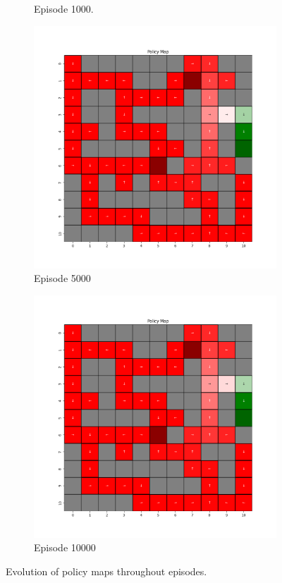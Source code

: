 \documentclass{assignment}
\begin{document}
\begin{figure}[H]
\begin{subfigure}{0.3\textwidth}
    \caption{Episode 1000.}
    \end{subfigure}\hfill
    \begin{subfigure}{0.3\textwidth}
        \includegraphics[width=\textwidth]{figures/policy_q/gamma_sweep/policy_alpha_0.1_gamma_0.75_epsilon_0.2_iteration_5000.png}
    \caption{Episode 5000}
    \end{subfigure}\hfill
    \begin{subfigure}{0.3\textwidth}
        \includegraphics[width=\textwidth]{figures/policy_q/gamma_sweep/policy_alpha_0.1_gamma_0.75_epsilon_0.2_iteration_10000.png}
    \caption{Episode 10000}
    \end{subfigure}
    \caption{Evolution of policy maps throughout episodes.}
    \label{fig:gamma_0.75_q_learning_policy}
\end{figure}
\end{document}
